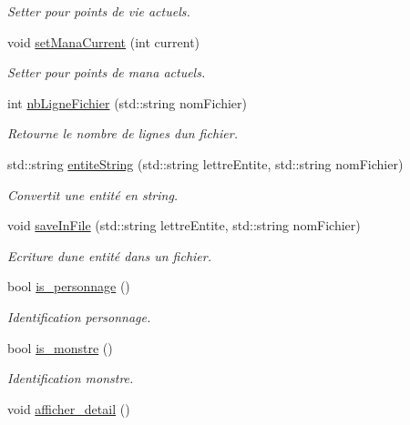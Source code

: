 \begin{DoxyCompactItemize}
\begin{DoxyCompactList}\small\item\em Setter pour points de vie actuels. \end{DoxyCompactList}\item 
void \hyperlink{classentite_a33be38cbd4590fd55c5338a749ed4c06}{set\+Mana\+Current} (int current)
\begin{DoxyCompactList}\small\item\em Setter pour points de mana actuels. \end{DoxyCompactList}\item 
int \hyperlink{classentite_a983d51dcdfaaddaf95096587ea33a3ec}{nb\+Ligne\+Fichier} (std\+::string nom\+Fichier)
\begin{DoxyCompactList}\small\item\em Retourne le nombre de lignes d\textquotesingle{}un fichier. \end{DoxyCompactList}\item 
std\+::string \hyperlink{classentite_aef8675e5f8592e0cc56661d4d5827d1f}{entite\+String} (std\+::string lettre\+Entite, std\+::string nom\+Fichier)
\begin{DoxyCompactList}\small\item\em Convertit une entité en string. \end{DoxyCompactList}\item 
void \hyperlink{classentite_a7bd09aa63160345500b6d6c4dca6cf52}{save\+In\+File} (std\+::string lettre\+Entite, std\+::string nom\+Fichier)
\begin{DoxyCompactList}\small\item\em Ecriture d\textquotesingle{}une entité dans un fichier. \end{DoxyCompactList}\item 
bool \hyperlink{classentite_a191b1da1ad1198918c533e552148b8b9}{is\+\_\+personnage} ()
\begin{DoxyCompactList}\small\item\em Identification personnage. \end{DoxyCompactList}\item 
bool \hyperlink{classentite_a0c583315bc4dbc9db089eb229b3977af}{is\+\_\+monstre} ()
\begin{DoxyCompactList}\small\item\em Identification monstre. \end{DoxyCompactList}\item 
void \hyperlink{classentite_af6ddcb65074eef70bdac220a5a3ed4cf}{afficher\+\_\+detail} ()

\end{DoxyCompactItemize}
